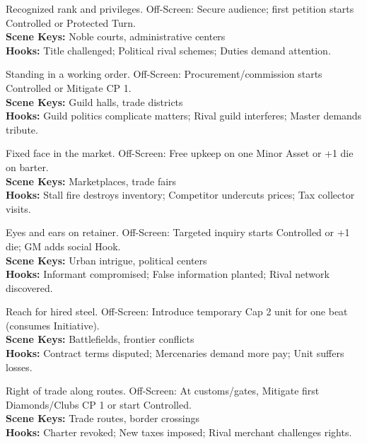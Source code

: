 \documentclass[12pt]{article}
\begin{document}
\begin{description}[leftmargin=*]
  \item[\textbf{Noble Title/Charter}] Recognized rank and privileges. Off-Screen: Secure audience; first petition starts Controlled or Protected Turn. \\
  \textbf{Scene Keys:} Noble courts, administrative centers \\
  \textbf{Hooks:} Title challenged; Political rival schemes; Duties demand attention.

  \item[\textbf{Guild Membership}] Standing in a working order. Off-Screen: Procurement/commission starts Controlled or Mitigate CP 1. \\
  \textbf{Scene Keys:} Guild halls, trade districts \\
  \textbf{Hooks:} Guild politics complicate matters; Rival guild interferes; Master demands tribute.

  \item[\textbf{Merchant Stall/Front}] Fixed face in the market. Off-Screen: Free upkeep on one Minor Asset or +1 die on barter. \\
  \textbf{Scene Keys:} Marketplaces, trade fairs \\
  \textbf{Hooks:} Stall fire destroys inventory; Competitor undercuts prices; Tax collector visits.

  \item[\textbf{Spy Ring/Informants}] Eyes and ears on retainer. Off-Screen: Targeted inquiry starts Controlled or +1 die; GM adds social Hook. \\
  \textbf{Scene Keys:} Urban intrigue, political centers \\
  \textbf{Hooks:} Informant compromised; False information planted; Rival network discovered.

  \item[\textbf{Mercenary Contract}] Reach for hired steel. Off-Screen: Introduce temporary Cap 2 unit for one beat (consumes Initiative). \\
  \textbf{Scene Keys:} Battlefields, frontier conflicts \\
  \textbf{Hooks:} Contract terms disputed; Mercenaries demand more pay; Unit suffers losses.

  \item[\textbf{Trading Charter}] Right of trade along routes. Off-Screen: At customs/gates, Mitigate first Diamonds/Clubs CP 1 or start Controlled. \\
  \textbf{Scene Keys:} Trade routes, border crossings \\
  \textbf{Hooks:} Charter revoked; New taxes imposed; Rival merchant challenges rights.


\end{description}
\end{document}
